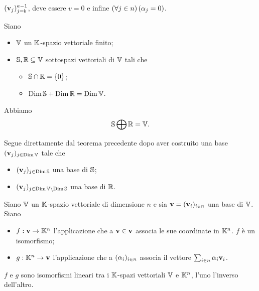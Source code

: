$(\mathbf{v}_j)_{j = b}^{a - 1}$, deve essere $v = 0$ e infine
$\left ( \forall j \in n \right ) \left ( \alpha_j = 0 \right )$. \EndProof
\begin{Corollary}
  Siano
  \begin{itemize}
    \item $\mathbb{V}$ un $\mathbb{K}$-spazio vettoriale finito;
    \item $\mathbb{S}, \mathbb{R} \subseteq \mathbb{V}$
      sottospazi vettoriali di $\mathbb{V}$ tali che
      \begin{itemize}
        \item $\mathbb{S} \cap \mathbb{R} = \lbrace 0 \rbrace$;
        \item $\operatorname{Dim}{\mathbb{S}}
                + \operatorname{Dim}{\mathbb{R}}
                = \operatorname{Dim}{\mathbb{V}}$.
      \end{itemize}
  \end{itemize}
  Abbiamo
  \[
    \mathbb{S} \bigoplus \mathbb{R} = \mathbb{V}.
  \]
\end{Corollary}
\Proof Segue direttamente dal teorema precedente dopo aver costruito una base
$(\mathbf{v}_j)_{j \in \operatorname{Dim}{\mathbb{V}}}$ tale che
\begin{itemize}
  \item $(\mathbf{v}_j)_{j \in \operatorname{Dim}{\mathbb{S}}}$ una
    base di $\mathbb{S}$;
  \item $(\mathbf{v}_j)_{j \in
    \operatorname{Dim}{\mathbb{V}} \setminus \operatorname{Dim}{\mathbb{S}}}$
    una base di $\mathbb{R}$. \EndProof
\end{itemize}
\begin{Theorem}
	Siano $\mathbb{V}$ un $\mathbb{K}$-spazio vettoriale di dimensione $n$ e sia $\mathbf{v} = (\mathbf{v}_i)_{i \in n}$ una base di $\mathbb{V}$. Siano
	\begin{itemize}
		\item $f: \mathbf{v} \rightarrow \mathbb{K}^n$ l'applicazione che a $\mathbf{v} \in \mathbf{v}$ associa le sue coordinate in $\mathbb{K}^n$. $f$ \`e un isomorfismo;
		\item $g: \mathbb{K}^n \rightarrow \mathbf{v}$ l'applicazione che a $(\alpha_i)_{i \in n}$ associa il vettore $\sum_{i \in n} \alpha_i \mathbf{v}_i$.
	\end{itemize}
	$f$ e $g$ sono isomorfismi lineari tra i $\mathbb{K}$-spazi vettoriali $\mathbb{V}$ e $\mathbb{K}^n$, l'uno l'inverso dell'altro.
\end{Theorem}

